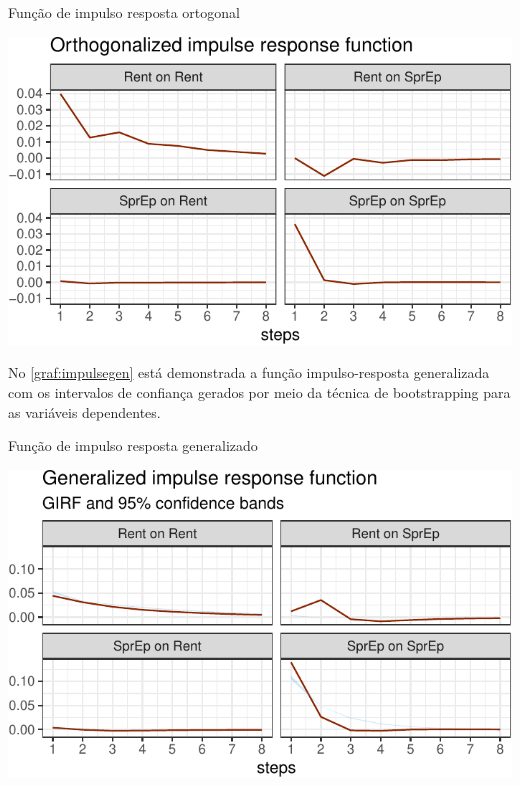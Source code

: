 \documentclass[
  12pt,
  12pt,
  openright,
  oneside,
  a4paper,
  chapter=TITLE,
  section=TITLE,
  subsection=TITLE,
  subsubsection=TITLE,
  english,
  portugues,
  sumario=tradicional]{abntex2}
\begin{document}
\begin{grafico}[!htbp]
\caption{Função de impulso resposta ortogonal}
\vspace{-4mm}

\begin{center}\includegraphics{12-exportedfigures/impulse.plot.orto-1} \end{center}
\vspace{-3mm}
\label{graf:impulseorto}
\vspace{-2mm}
\end{grafico}

No \autoref{graf:impulsegen} está demonstrada a função impulso-resposta generalizada com os intervalos de confiança gerados por meio da técnica de bootstrapping para as variáveis dependentes.

\begin{grafico}[!htbp]
\caption{Função de impulso resposta generalizado}
\vspace{-4mm}

\begin{center}\includegraphics{12-exportedfigures/impulse.plot.genera-1} \end{center}
\vspace{-3mm}
\label{graf:impulsegen}
\vspace{-2mm}
\end{grafico}
\end{document}
